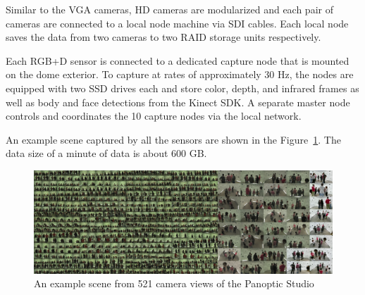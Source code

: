 Similar to the VGA cameras, HD cameras are modularized and each pair of cameras are connected to a local node machine via SDI cables. Each local node saves the data from two cameras to two RAID storage units respectively.


Each RGB+D sensor is connected to a dedicated capture node that is mounted on the dome exterior. To capture at rates of approximately 30 Hz, the nodes are equipped with two SSD drives each and store color, depth, and infrared frames as well as body and face detections from the Kinect SDK. A separate master node controls and coordinates the 10 capture nodes via the local network.

An example scene captured by all the sensors are shown in the Figure~\ref{fig:panopticviews}. The data size of a minute of data is about 600 GB. 

\begin{figure}[t]
	\centering       
	\includegraphics[trim=0 0 0 0,clip,width=\linewidth]{figures/Teaser}
	
	\caption{An example scene from 521 camera views of the Panoptic Studio}
	\label{fig:panopticviews}
\end{figure}


